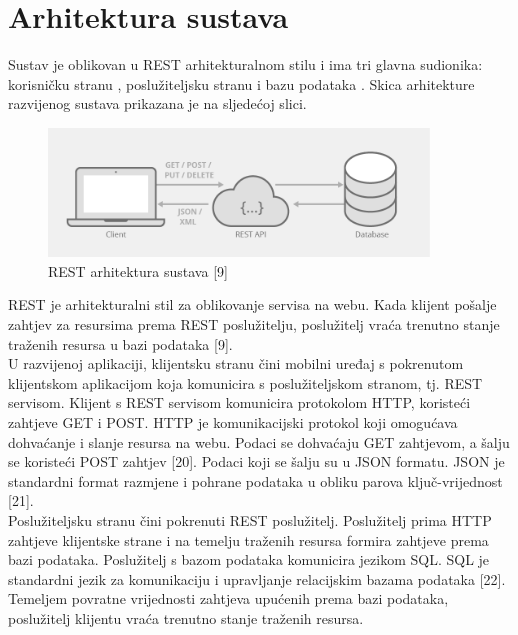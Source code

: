 \documentclass[times, utf8, zavrsni]{fer}
\begin{document}
\section{Arhitektura sustava}
Sustav je oblikovan u REST arhitekturalnom stilu i ima tri glavna sudionika: korisničku stranu , poslužiteljsku stranu  i bazu podataka . Skica arhitekture razvijenog sustava prikazana je na sljedećoj slici.
\newpage
%
\begin{figure}[!h]
\centering
\includegraphics[width=0.9\textwidth]{./slike/app1}
\caption{REST arhitektura sustava [9]}
\label{fig:app1}
\end{figure}
%
REST  je arhitekturalni stil za oblikovanje servisa na webu. Kada klijent pošalje zahtjev za resursima prema REST poslužitelju, poslužitelj vraća trenutno stanje traženih resursa u bazi podataka [9]. \\

U razvijenoj aplikaciji, klijentsku stranu čini mobilni uređaj s pokrenutom klijentskom aplikacijom koja komunicira s poslužiteljskom stranom, tj. REST servisom. Klijent s REST servisom komunicira protokolom HTTP, koristeći zahtjeve GET i POST. HTTP je komunikacijski protokol koji omogućava dohvaćanje i slanje resursa na webu. Podaci se dohvaćaju GET zahtjevom, a šalju se koristeći POST zahtjev [20]. Podaci koji se šalju su u JSON formatu. JSON  je standardni format razmjene i pohrane podataka u obliku parova ključ-vrijednost  [21].\\

Poslužiteljsku stranu čini pokrenuti REST poslužitelj. Poslužitelj prima HTTP zahtjeve klijentske strane i na temelju traženih resursa formira zahtjeve prema bazi podataka. Poslužitelj s bazom podataka komunicira jezikom SQL. SQL  je standardni jezik za komunikaciju i upravljanje relacijskim bazama podataka [22]. Temeljem povratne vrijednosti zahtjeva upućenih prema bazi podataka, poslužitelj klijentu vraća trenutno stanje traženih resursa.\\
\end{document}
